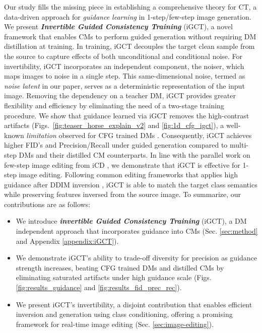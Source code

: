 Our study fills the missing piece in establishing a comprehensive theory for CT, a data-driven approach for \textit{guidance learning} in 1-step/few-step image generation. We present \textbf{\textit{Invertible Guided Consistency Training}} (iGCT), a novel framework that enables CMs to perform guided generation without requiring DM distillation at training. In training, iGCT decouples the target clean sample from the source to capture effects of both unconditional and conditional noise. For invertibility, iGCT incorporates an independent component, the noiser, which maps images to noise in a single step. This same-dimensional noise, termed as \textit{noise latent} in our paper, serves as a deterministic representation of the input image. Removing the dependency on a teacher DM, iGCT provides greater flexibility and efficiency by eliminating the need of a two-stage training procedure. We show that guidance learned via iGCT removes the high-contrast artifacts (Figs.~\ref{fig:teaser_horse_explain_v2} and \ref{fig:1d_cfg_igct}), a well-known \textit{limitation} observed for CFG trained DMs \cite{ho2022imagenvideohighdefinition,saharia2022photorealistictexttoimagediffusionmodels,bradley2024classifierfreeguidancepredictorcorrector,kynkaanniemi2024applying,karras2024guiding}. Consequently, iGCT achieves higher FID's and Precision/Recall under guided generation compared to multi-step DMs and their distilled CM counterparts. In line with the parallel work on few-step image editing from iCD \cite{starodubcev2024invertible}, we demonstrate that iGCT is effective for 1-step image editing. Following common editing frameworks that applies high guidance after DDIM inversion \cite{mokady2023null,miyake2023negative,han2024proxedit,starodubcev2024invertible}, iGCT is able to match the target class semantics while preserving features inversed from the source image. To summarize, our contributions are as follows:
\begin{itemize}
    \vspace{-0.5em}
    \item We introduce \textbf{\textit{invertible Guided Consistency Training}} (iGCT), a DM independent approach that incorporates guidance into CMs (Sec. \ref{sec:method} and Appendix \ref{appendix:iGCT}). 
    \vspace{-0.5em}
    \item We demonstrate iGCT's ability to trade-off diversity for precision as guidance strength increases, beating CFG trained DMs and distilled CMs by eliminating saturated artifacts under high guidance scale (Figs. \ref{fig:results_guidance} and  \ref{fig:results_fid_prec_rec}).
    \vspace{-0.5em}
    \item We present iGCT’s invertibility, a disjoint contribution that enables efficient inversion and generation using class conditioning, offering a promising framework for real-time image editing (Sec. \ref{sec:image-editing}).
\end{itemize}

